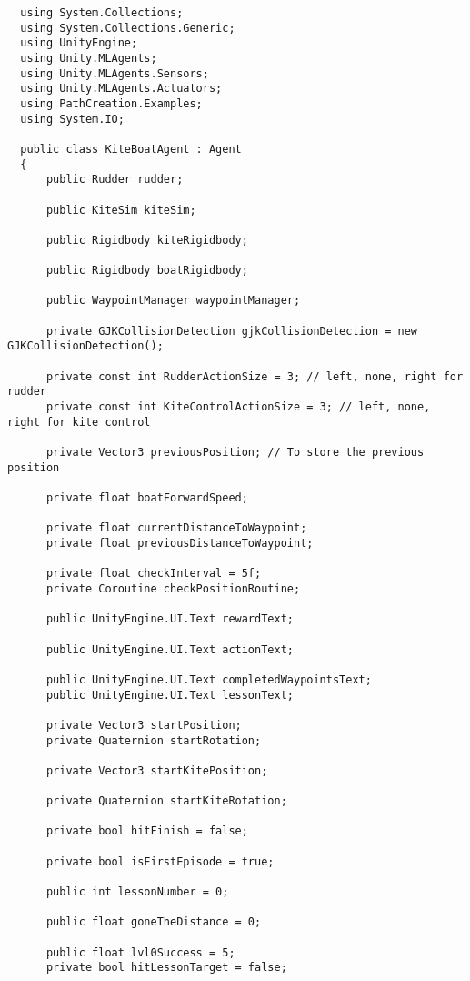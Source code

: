 \begin{lstlisting}
  using System.Collections;
  using System.Collections.Generic;
  using UnityEngine;
  using Unity.MLAgents;
  using Unity.MLAgents.Sensors;
  using Unity.MLAgents.Actuators;
  using PathCreation.Examples;
  using System.IO;
  
  public class KiteBoatAgent : Agent
  {
      public Rudder rudder;
  
      public KiteSim kiteSim;
  
      public Rigidbody kiteRigidbody;
  
      public Rigidbody boatRigidbody;
  
      public WaypointManager waypointManager;
  
      private GJKCollisionDetection gjkCollisionDetection = new GJKCollisionDetection();
  
      private const int RudderActionSize = 3; // left, none, right for rudder
      private const int KiteControlActionSize = 3; // left, none, right for kite control
  
      private Vector3 previousPosition; // To store the previous position
  
      private float boatForwardSpeed;
  
      private float currentDistanceToWaypoint;
      private float previousDistanceToWaypoint;
  
      private float checkInterval = 5f;
      private Coroutine checkPositionRoutine;
  
      public UnityEngine.UI.Text rewardText;
  
      public UnityEngine.UI.Text actionText;
  
      public UnityEngine.UI.Text completedWaypointsText;
      public UnityEngine.UI.Text lessonText;
  
      private Vector3 startPosition;
      private Quaternion startRotation;
  
      private Vector3 startKitePosition;
  
      private Quaternion startKiteRotation;
  
      private bool hitFinish = false;
  
      private bool isFirstEpisode = true;
  
      public int lessonNumber = 0;
      
      public float goneTheDistance = 0;
  
      public float lvl0Success = 5;
      private bool hitLessonTarget = false;
  

\end{lstlisting}
